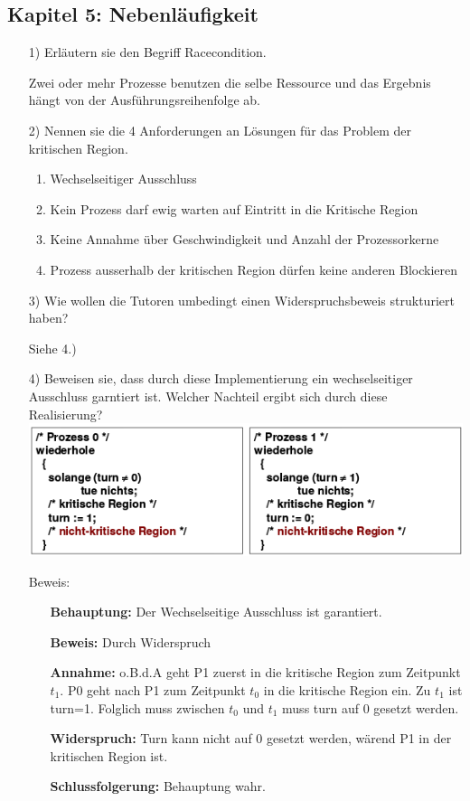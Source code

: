 \documentclass[11pt,a4paper]{article}
\begin{document}
\subsection*{Kapitel 5: Nebenläufigkeit}
\begin{itemize}
\item[1)] Erläutern sie den Begriff \glqq Racecondition\grqq.

Zwei oder mehr Prozesse benutzen die selbe Ressource und das Ergebnis hängt von der Ausführungsreihenfolge ab.
\item[2)] Nennen sie die 4 Anforderungen an Lösungen für das Problem der kritischen Region.
\begin{enumerate}
\item Wechselseitiger Ausschluss
\item Kein Prozess darf ewig warten auf Eintritt in die Kritische Region
\item Keine Annahme über Geschwindigkeit und Anzahl der Prozessorkerne
\item Prozess ausserhalb der kritischen Region dürfen keine anderen Blockieren
\end{enumerate}
\item[3)] Wie wollen die Tutoren umbedingt einen Widerspruchsbeweis strukturiert haben?

Siehe 4.)
\item[4)] Beweisen sie, dass durch diese Implementierung ein wechselseitiger Ausschluss garntiert ist. Welcher Nachteil ergibt sich durch diese Realisierung?\\
\includegraphics[scale=0.7]{kap5strikt.png}

Beweis:
\begin{itemize}
\item[] \textbf{Behauptung:} Der Wechselseitige Ausschluss ist garantiert.
\item[] \textbf{Beweis:} Durch Widerspruch
\item[] \textbf{Annahme:} o.B.d.A geht P1 zuerst in die kritische Region zum Zeitpunkt $t_1$. P0 geht nach P1 zum Zeitpunkt $t_0$ in die kritische Region ein. Zu $t_1$ ist turn=1. Folglich muss zwischen $t_0$ und $t_1$ muss turn auf 0 gesetzt werden.
\item[] \textbf{Widerspruch:} Turn kann nicht auf 0 gesetzt werden, wärend P1 in der kritischen Region ist.
\item[] \textbf{Schlussfolgerung:} Behauptung wahr.
\end{itemize}


\end{itemize}
\end{document}

